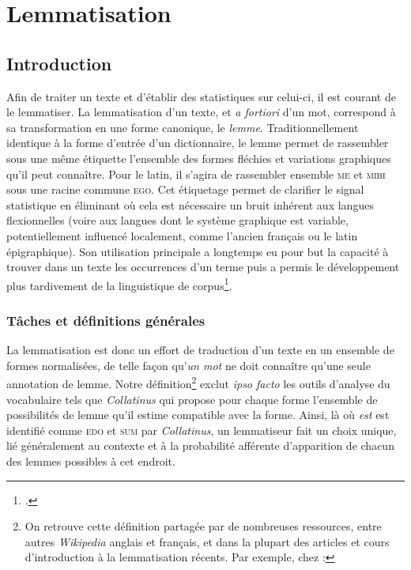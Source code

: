 \chapter{Lemmatisation}
\label{sec:lemmatiseurs}

\section{Introduction}
\label{subsec:lemma_intro}

Afin de traiter un texte et d'établir des statistiques sur celui-ci, il est courant de le lemmatiser. La lemmatisation d'un texte, et \textit{a fortiori} d'un mot, correspond à sa transformation en une forme canonique, le \textit{lemme}. Traditionnellement identique à la forme d'entrée d'un dictionnaire, le lemme permet de rassembler sous une même étiquette l'ensemble des formes fléchies et variations graphiques qu'il peut connaître. Pour le latin, il s'agira de rassembler ensemble \textsc{me} et \textsc{mihi} sous une racine commune \textsc{ego}. Cet étiquetage permet de clarifier le signal statistique en éliminant où cela est nécessaire un bruit inhérent aux langues flexionnelles (voire aux langues dont le système graphique est variable, potentiellement influencé localement, comme l'ancien français ou le latin épigraphique). Son utilisation principale a longtemps eu pour but la capacité à trouver dans un texte les occurrences d'un terme puis a permis le développement plus tardivement de la linguistique de corpus\footcite{mellet2002atouts}.

\subsection{Tâches et définitions générales}

La lemmatisation est donc un effort de traduction d'un texte en un ensemble de formes normalisées, de telle façon qu'\textit{un mot} ne doit connaître qu'une seule annotation de lemme. Notre définition\footnote{On retrouve cette définition partagée par de nombreuses ressources, entre autres \textit{Wikipedia} anglais et français, et dans la plupart des articles et cours d'introduction à la lemmatisation récents. Par exemple, chez \textcite{srinidhi_lemmatization_2020}: } exclut \textit{ipso facto} les outils d'analyse du vocabulaire tels que \textit{Collatinus} qui propose pour chaque forme l'ensemble de possibilités de lemme qu'il estime compatible avec la forme. Ainsi, là où \textit{est} est identifié comme \textsc{edo} et \textsc{sum} par \textit{Collatinus}, un lemmatiseur fait un choix unique, lié généralement au contexte et à la probabilité afférente d'apparition de chacun des lemmes possibles à cet endroit.


